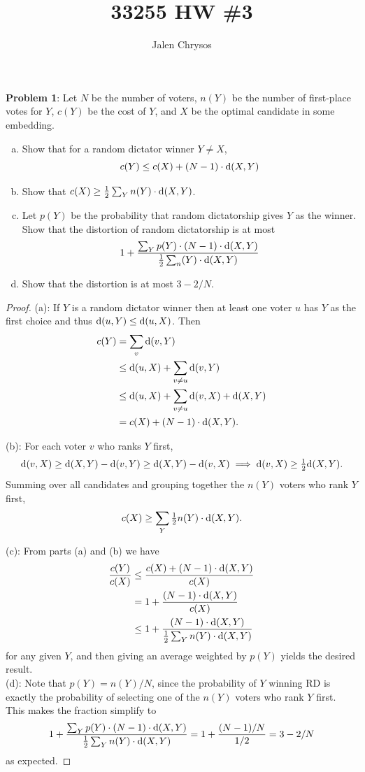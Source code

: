 \documentclass{amsart}
\title{33255 HW \#3}
\author{Jalen Chrysos}
\begin{document}
	
	\maketitle
	
	\textbf{Problem 1}: Let $N$ be the number of voters, $n(Y)$ be the number of first-place votes for $Y$, $c(Y)$ be the cost of $Y$, and $X$ be the optimal candidate in some embedding.
	\begin{enumerate}[(a)]
		\item Show that for a random dictator winner $Y\neq X$,
		$$
		c(Y)\leq c(X) + (N-1)\cdot \textrm{d}(X,Y)
		$$
		\item Show that $c(X)\geq \tfrac12 \sum_Yn(Y) \cdot \textrm{d}(X,Y)$.
		\item Let $p(Y)$ be the probability that random dictatorship gives $Y$ as the winner. Show that the distortion of random dictatorship is at most
		$$
		1 + \frac{\sum_Yp(Y) \cdot (N-1) \cdot \textrm{d}(X,Y)}{\tfrac12 \sum_ n(Y) \cdot \textrm{d}(X,Y)}
		$$
		\item Show that the distortion is at most $3-2/N$.
	\end{enumerate}
	
	\begin{proof}
		(a): If $Y$ is a random dictator winner then at least one voter $u$ has $Y$ as the first choice and thus $\textrm{d}(u,Y)\leq \textrm{d}(u,X)$. Then
		\begin{align*}
		c(Y) &= \sum_v \textrm{d}(v,Y) \\
		&\leq \textrm{d}(u,X) + \sum_{v\neq u} \textrm{d}(v,Y) \\
		&\leq \textrm{d}(u,X) + \sum_{v\neq u} \textrm{d}(v,X) + \textrm{d}(X,Y)\\
		&= c(X) + (N-1)\cdot \textrm{d}(X,Y).
		\end{align*}
		
		(b): For each voter $v$ who ranks $Y$ first, 
		$$\textrm{d}(v,X) \geq \textrm{d}(X,Y) - \textrm{d}(v,Y) \geq \textrm{d}(X,Y) - \textrm{d}(v,X) \implies \textrm{d}(v,X) \geq \tfrac12 \textrm{d}(X,Y).$$
		Summing over all candidates and grouping together the $n(Y)$ voters who rank $Y$ first,
		$$
		c(X) \geq \sum_Y \tfrac12 n(Y) \cdot \textrm{d}(X,Y).
		$$
		
		(c): From parts (a) and (b) we have
		\begin{align*}
		\frac{c(Y)}{c(X)} &\leq \frac{c(X) + (N-1)\cdot \textrm{d}(X,Y)}{c(X)}\\
		&= 1 + \frac{(N-1)\cdot \textrm{d}(X,Y)}{c(X)}\\
		&\leq 1 + \frac{(N-1)\cdot \textrm{d}(X,Y)}{\tfrac12 \sum_Yn(Y) \cdot \textrm{d}(X,Y)}
		\end{align*}
		for any given $Y$, and then giving an average weighted by $p(Y)$ yields the desired result.\\
		
		(d): Note that $p(Y) = n(Y)/N$, since the probability of $Y$ winning RD is exactly the probability of selecting one of the $n(Y)$ voters who rank $Y$ first. This makes the fraction simplify to
		$$
		1 + \frac{\sum_Y p(Y) \cdot (N-1) \cdot \textrm{d}(X,Y)}{\tfrac12 \sum_Y n(Y) \cdot \textrm{d}(X,Y)} = 1 + \frac{(N-1)/N}{1/2} = 3-2/N
		$$
		as expected.
	\end{proof}\\
	
\end{document}
